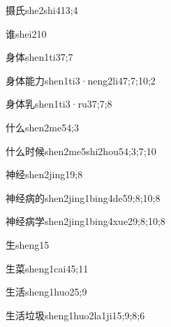 \begin{verbete}{摄氏}{she2shi4}{13;4}
\end{verbete}
\begin{verbete}{谁}{shei2}{10}
\end{verbete}
\begin{verbete}{身体}{shen1ti3}{7;7}
\end{verbete}
\begin{verbete}{身体能力}{shen1ti3·neng2li4}{7;7;10;2}
\end{verbete}
\begin{verbete}{身体乳}{shen1ti3·ru3}{7;7;8}
\end{verbete}
\begin{verbete}{什么}{shen2me5}{4;3}
\end{verbete}
\begin{verbete}{什么时候}{shen2me5shi2hou5}{4;3;7;10}
\end{verbete}
\begin{verbete}{神经}{shen2jing1}{9;8}
\end{verbete}
\begin{verbete}{神经病的}{shen2jing1bing4de5}{9;8;10;8}
\end{verbete}
\begin{verbete}{神经病学}{shen2jing1bing4xue2}{9;8;10;8}
\end{verbete}
\begin{verbete}{生}{sheng1}{5}
\end{verbete}
\begin{verbete}{生菜}{sheng1cai4}{5;11}
\end{verbete}
\begin{verbete}{生活}{sheng1huo2}{5;9}
\end{verbete}
\begin{verbete}{生活垃圾}{sheng1huo2la1ji1}{5;9;8;6}
\end{verbete}
